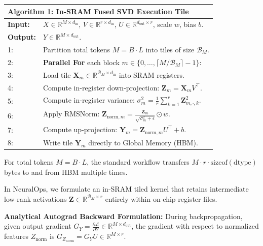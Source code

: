 \begin{table}[h]
\centering
\small
\begin{tabularx}{\columnwidth}{lX}
\toprule
\multicolumn{2}{l}{\textbf{Algorithm 1: In-SRAM Fused SVD Execution Tile}} \\
\midrule
\textbf{Input:} & $X \in \mathbb{R}^{M \times d_{\text{in}}}$, $V \in \mathbb{R}^{r \times d_{\text{in}}}$, $U \in \mathbb{R}^{d_{\text{out}} \times r}$, scale $w$, bias $b$. \\
\textbf{Output:} & $Y \in \mathbb{R}^{M \times d_{\text{out}}}$. \\
\midrule
1: & Partition total tokens $M = B \cdot L$ into tiles of size $\mathcal{B}_M$. \\
2: & \textbf{Parallel For} each block $m \in \{0, \dots, \lceil M / \mathcal{B}_M \rceil - 1\}$: \\
3: & \quad Load tile $\mathbf{X}_m \in \mathbb{R}^{\mathcal{B}_M \times d_{\text{in}}}$ into SRAM registers. \\
4: & \quad Compute in-register down-projection: $\mathbf{Z}_m = \mathbf{X}_m V^\top$. \\
5: & \quad Compute in-register variance: $\sigma_m^2 = \frac{1}{r} \sum_{k=1}^r \mathbf{Z}_{m, \cdot, k}^2$. \\
6: & \quad Apply RMSNorm: $\mathbf{Z}_{\text{norm}, m} = \frac{\mathbf{Z}_m}{\sqrt{\sigma_m^2 + \epsilon}} \odot w$. \\
7: & \quad Compute up-projection: $\mathbf{Y}_m = \mathbf{Z}_{\text{norm}, m} U^\top + b$. \\
8: & \quad Write tile $\mathbf{Y}_m$ directly to Global Memory (HBM). \\
\bottomrule
\end{tabularx}
\end{table}

For total tokens $M = B \cdot L$, the standard workflow transfers $M \cdot r \cdot \text{sizeof}(\text{dtype})$ bytes to and from HBM multiple times.

In NeuralOps, we formulate an in-SRAM tiled kernel that retains intermediate low-rank activations $\mathbf{Z} \in \mathbb{R}^{\mathcal{B}_M \times r}$ entirely within on-chip register files.

\textbf{Analytical Autograd Backward Formulation:} During backpropagation, given output gradient $G_Y = \frac{\partial \mathcal{L}}{\partial Y} \in \mathbb{R}^{M \times d_{\text{out}}}$, the gradient with respect to normalized features $Z_{\text{norm}}$ is $G_{Z_{\text{norm}}} = G_Y U \in \mathbb{R}^{M \times r}$.

